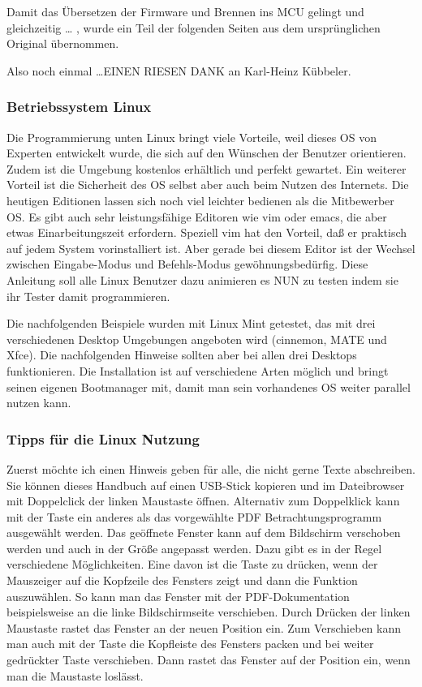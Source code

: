 Damit das Übersetzen der Firmware und Brennen ins MCU gelingt und gleichzeitig \dots
{}, wurde ein Teil der folgenden Seiten aus dem
ursprünglichen Original übernommen.

Also noch einmal \dots \LARGE{EINEN RIESEN DANK}
\normalsize an Karl-Heinz Kübbeler.

\subsubsection{Betriebssystem Linux}

Die Programmierung unten Linux bringt viele Vorteile, weil dieses OS von Experten entwickelt wurde,
die sich auf den Wünschen der Benutzer orientieren.
Zudem ist die Umgebung kostenlos erhältlich und perfekt gewartet.
Ein weiterer Vorteil ist die Sicherheit des OS selbst aber auch beim Nutzen des Internets.
Die heutigen Editionen lassen sich noch viel leichter bedienen als die Mitbewerber OS.
Es gibt auch sehr leistungsfähige Editoren wie vim oder emacs, die aber etwas
Einarbeitungszeit erfordern. Speziell vim hat den Vorteil, daß er praktisch auf
jedem System vorinstalliert ist. Aber gerade bei diesem Editor ist der
Wechsel zwischen Eingabe-Modus und Befehls-Modus gewöhnungsbedürfig.
Diese Anleitung soll alle  Linux Benutzer dazu animieren es NUN zu testen
indem sie ihr Tester damit programmieren.

Die nachfolgenden Beispiele wurden mit Linux Mint getestet, das
mit drei verschiedenen Desktop Umgebungen angeboten wird (cinnemon, MATE und Xfce).
Die nachfolgenden Hinweise sollten aber bei allen drei Desktops funktionieren.
Die Installation ist auf verschiedene Arten möglich und bringt seinen eigenen Bootmanager mit,
damit man sein vorhandenes OS weiter parallel nutzen kann.

\subsubsection{Tipps für die Linux Nutzung}

Zuerst möchte ich einen Hinweis geben für alle, die nicht gerne Texte abschreiben.
Sie können dieses Handbuch auf einen USB-Stick kopieren und im Dateibrowser mit Doppelclick der
linken Maustaste \LMB öffnen.
Alternativ zum Doppelklick kann mit der \RMB Taste ein anderes als das
vorgewählte PDF Betrachtungsprogramm ausgewählt werden.
Das geöffnete Fenster kann auf dem Bildschirm verschoben werden und auch in der Größe
angepasst werden. Dazu gibt es in der Regel verschiedene Möglichkeiten.
Eine davon ist die \RMB Taste zu drücken, wenn der Mauszeiger 
auf die Kopfzeile des Fensters zeigt und dann die Funktion  auszuwählen.
So kann man das Fenster mit der PDF-Dokumentation beispielsweise an die linke Bildschirmseite
verschieben. Durch Drücken der linken Maustaste rastet das Fenster an der neuen Position ein.
Zum Verschieben kann man auch mit der \LMB Taste die
Kopfleiste des Fensters packen und bei weiter gedrückter \LMB Taste verschieben.
Dann rastet das Fenster auf der Position ein, wenn man die Maustaste loslässt.

